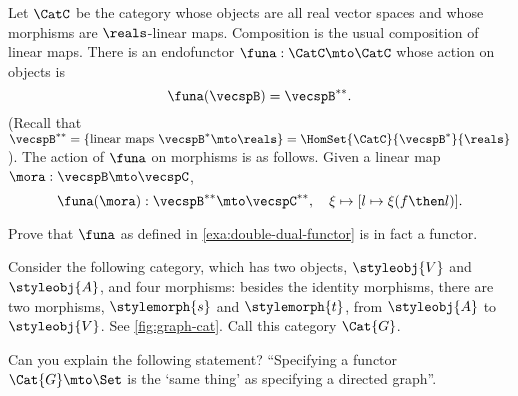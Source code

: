 \begin{example}\label{exa:double-dual-functor}
Let $\CatC$ be the category whose objects are all real vector spaces and whose morphisms are $\reals$-linear maps. Composition is the usual composition of linear maps. There is an endofunctor $\funa : \CatC \mto \CatC$ whose action on objects is
\begin{equation}
\funa ( \vecspB ) = \vecspB^{**}.
\end{equation}
(Recall that $\vecspB^{**} = \{ \text{linear maps } \vecspB^* \mto \reals \} =  \HomSet{\CatC}{\vecspB^*}{\reals}$).
The action of $\funa$ on morphisms is as follows. Given a linear map $\mora : \vecspB \mto \vecspC$, 
\begin{equation}
\funa ( \mora ) : \vecspB^{**} \mto \vecspC^{**}, \quad \xi \mapsto [ l \mapsto \xi (f \then l)].
\end{equation}


\end{example}

\begin{gradedexercise}\label{ex:DoubleDualFunctor}
Prove that $\funa$ as defined in \cref{exa:double-dual-functor} is in fact a functor. 
\end{gradedexercise}

\begin{gradedexercise}\label{ex:GraphsViaFunctors}
Consider the following category, which has two objects, $\styleobj{V}$ and $\styleobj{A}$, and four morphisms: besides the identity morphisms, there are two morphisms, $\stylemorph{s}$ and $\stylemorph{t}$, from $\styleobj{A}$ to $\styleobj{V}$. See \cref{fig:graph-cat}. Call this category $\Cat{G}$. 

Can you explain the following statement? ``Specifying a functor $\Cat{G} \mto \Set$ is the `same thing' as specifying a directed graph''.  
\end{gradedexercise}


\begin{marginfigure}
\begin{center}
\end{center}
\caption{}
  \label{fig:graph-cat}
\end{marginfigure}

